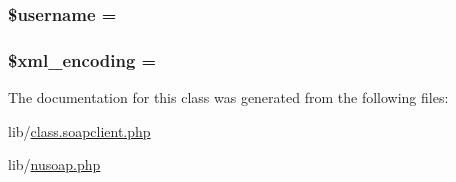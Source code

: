 \subsubsection[{\$username}]{\setlength{\rightskip}{0pt plus 5cm}\$username = \textquotesingle{}\textquotesingle{}}\label{classnusoap__client_a0eb82aa5f81cf845de4b36cd653c42cf}
\hypertarget{classnusoap__client_a1e2ee3fea6dbb8374da999a9df7d024d}{}
\subsubsection[{\$xml\+\_\+encoding}]{\setlength{\rightskip}{0pt plus 5cm}\$xml\+\_\+encoding = \textquotesingle{}\textquotesingle{}}\label{classnusoap__client_a1e2ee3fea6dbb8374da999a9df7d024d}


The documentation for this class was generated from the following files\+:\begin{DoxyCompactItemize}
\item 
lib/\hyperlink{class_8soapclient_8php}{class.\+soapclient.\+php}\item 
lib/\hyperlink{nusoap_8php}{nusoap.\+php}\end{DoxyCompactItemize}
